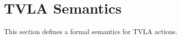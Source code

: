 \section{TVLA Semantics}
\label{Se:TVLASemantics}

This section defines a formal semantics for TVLA actions.

